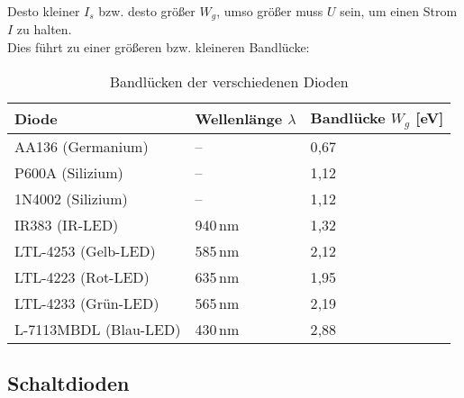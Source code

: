 \documentclass[
	a4paper, %
	12pt, %
]{CSUniSchoolLabReport}
\begin{document}
\vspace{1em} 

Desto kleiner $I_s$ bzw. desto größer $W_g$, umso größer muss $U$ sein, um einen Strom $I$ zu halten.\\  
Dies führt zu einer größeren bzw. kleineren Bandlücke:\\


\begin{table}[h]
\centering
\begin{tabular}{lll}
\toprule
\textbf{Diode} & \textbf{Wellenlänge \(\lambda\)} & \textbf{Bandlücke \(W_g\) [eV]} \\
\midrule
AA136 (Germanium)     & --              & 0{,}67 \\
P600A (Silizium)      & --              & 1{,}12 \\
1N4002 (Silizium)     & --              & 1{,}12 \\
IR383 (IR-LED)        & 940\,nm         & 1{,}32 \\
LTL-4253 (Gelb-LED)   & 585\,nm         & 2{,}12 \\
LTL-4223 (Rot-LED)    & 635\,nm         & 1{,}95 \\
LTL-4233 (Grün-LED)   & 565\,nm         & 2{,}19 \\
L-7113MBDL (Blau-LED) & 430\,nm         & 2{,}88 \\
\bottomrule
\end{tabular}
\caption{Bandlücken der verschiedenen Dioden}
\end{table}


\subsection{Schaltdioden}
\end{document}
